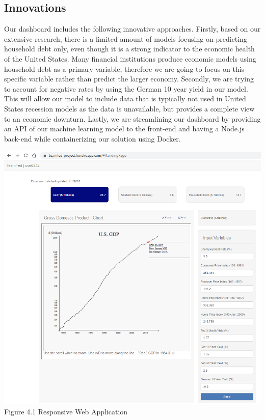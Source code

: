 \documentclass[sigconf,nonacm,11pt]{acmart}
\begin{document}
\vspace{-0.5em}


\subsection{Innovations}

Our dashboard includes the following innovative approaches. Firstly, based on our extensive research, there is a limited amount of models focusing on predicting household debt only, even though it is a strong indicator to the economic health of the United States. Many financial institutions produce economic models using household debt as a primary variable, therefore we are going to focus on this specific variable rather than predict the larger economy. Secondly, we are trying to account for negative rates by using the German 10 year yield in our model. This will allow our model to include data that is typically not used in United States recession models as the data is unavailable, but provides a complete view to an economic downturn. Lastly, we are streamlining our dashboard by providing an API of our machine learning model to the front-end and having a Node.js back-end while containerizing our solution using Docker.\vspace{0.5em}


\includegraphics[scale = 0.32]{dashboard.png}
Figure 4.1 Responsive Web Application
\vspace{0.5em}
\end{document}
